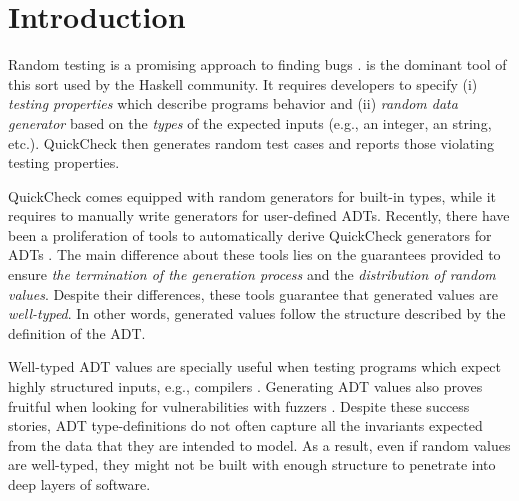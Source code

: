 \section{Introduction}

Random testing is a promising approach to finding bugs
\cite{HughesNSA16,HughesPAN16,ArtsHNS15}.
%
\quickcheck \cite{ClaessenH00} is the dominant tool of this sort used by the
Haskell community.
%
It requires developers to specify (i) \emph{testing properties} which describe
programs behavior and (ii) \emph{random data generator} based on the
{\emph{types}} of the expected inputs (e.g., an integer, an string,
etc.). %
%
QuickCheck then generates random test cases and reports those violating testing
properties.
%

QuickCheck comes equipped with random generators for built-in types, while it
requires to manually write generators for user-defined ADTs.
%
Recently, there have been a proliferation of tools to automatically derive
QuickCheck generators for ADTs
\cite{mitchell2007,RuncimanNL08,DuregardJW12,grieco2017,DBLP:conf/haskell/MistaRH18}.
%
The main difference about these tools lies on the guarantees provided to ensure
\emph{the termination of the generation process} and the \emph{distribution of
  random values}.
%
Despite their differences, these tools guarantee that generated values are
\emph{well-typed}.
%
In other words, generated values follow the structure described by the
definition of the ADT.
%

Well-typed ADT values are specially useful when testing programs which expect
highly structured inputs, e.g., compilers \cite{Palka11,MidtgaardJKNN17}.
%
Generating ADT values also proves fruitful when looking for vulnerabilities with
fuzzers \cite{GriecoCB16,grieco2017}.
%
%
Despite these success stories, ADT type-definitions do not often capture all the
invariants expected from the data that they are intended to model.
%
As a result, even if random values are well-typed, they might not be built with
enough structure to penetrate into deep layers of software.

